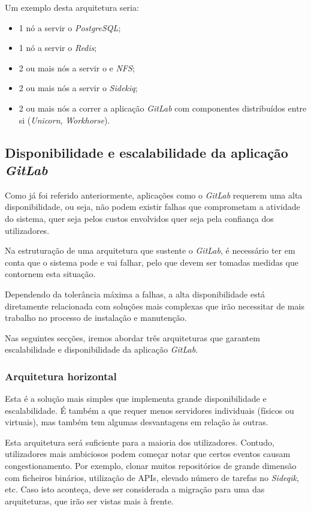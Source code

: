\documentclass[12pt,a4paper]{article}
\begin{document}
Um exemplo desta arquitetura seria:
\begin{itemize}
    \item 1 nó a servir o \emph{PostgreSQL};
    \item 1 nó a servir o \emph{Redis};
    \item 2 ou mais nós a servir o  e \emph{NFS};
    \item 2 ou mais nós a servir o \emph{Sidekiq};
    \item 2 ou mais nós a correr a aplicação \emph{GitLab} com componentes distribuídos entre si (\emph{Unicorn}, \emph{Workhorse}).
\end{itemize}
\fi



\subsection{Disponibilidade e escalabilidade da aplicação \emph{GitLab}}

Como já foi referido anteriormente, aplicações como o \emph{GitLab} requerem uma alta disponibilidade, ou seja, não podem existir falhas que comprometam a atividade do sistema, quer seja pelos custos envolvidos quer seja pela confiança dos utilizadores.

Na estruturação de uma arquitetura que sustente o \emph{GitLab}, é necessário ter em conta que o sistema pode e vai falhar, pelo que devem ser tomadas medidas que contornem esta situação.

Dependendo da tolerância máxima a falhas, a alta disponibilidade está diretamente relacionada com soluções mais complexas que irão necessitar de mais trabalho no processo de instalação e manutenção.

Nas seguintes secções, iremos abordar três arquiteturas que garantem escalabilidade e disponibilidade da aplicação \emph{GitLab}.


\subsubsection{Arquitetura horizontal}

Esta é a solução mais simples que implementa grande disponibilidade e escalabilidade. É também a que requer menos servidores individuais (físicos ou virtuais), mas também tem algumas desvantagens em relação às outras.

Esta arquitetura será suficiente para a maioria dos utilizadores. Contudo, utilizadores mais ambiciosos podem começar notar que certos eventos causam congestionamento. Por exemplo, clonar muitos repositórios de grande dimensão com ficheiros binários, utilização de APIs, elevado número de tarefas no \emph{Sideqik}, etc. Caso isto aconteça, deve ser considerada a migração para uma das arquiteturas, que irão ser vistas mais à frente.
\end{document}
